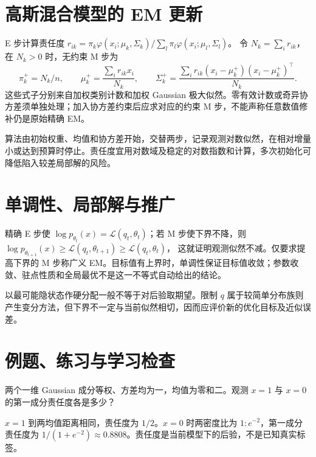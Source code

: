 \documentclass[UTF8,12pt,a4paper,fontset=fandol]{ctexbook}
\begin{document}
\section{高斯混合模型的 EM 更新}

E 步计算责任度
$r_{ik}=\pi_k\varphi(x_i;\mu_k,\Sigma_k)/\sum_l\pi_l\varphi(x_i;\mu_l,\Sigma_l)$。
令 $N_k=\sum_i r_{ik}$，在 $N_k>0$ 时，无约束 M 步为
\begin{equation}
 \pi_k^+=N_k/n,\qquad
 \mu_k^+=\frac{\sum_ir_{ik}x_i}{N_k},\qquad
 \Sigma_k^+=\frac{\sum_ir_{ik}(x_i-\mu_k^+)(x_i-\mu_k^+)^\top}{N_k}.
 \label{eq:ml-gmm-mstep}
\end{equation}
这些式子分别来自加权类别计数和加权 Gaussian 极大似然。零有效计数或奇异协方差须单独处理；加入协方差约束后应求对应的约束 M 步，不能声称任意数值修补仍是原始精确 EM。

算法由初始权重、均值和协方差开始，交替两步，记录观测对数似然，在相对增量小或达到预算时停止。责任度宜用对数域及稳定的对数指数和计算，多次初始化可降低陷入较差局部解的风险。

\section{单调性、局部解与推广}

精确 E 步使 $\log p_{\theta_t}(x)=\mathcal L(q_t,\theta_t)$；若 M 步使下界不降，则
$\log p_{\theta_{t+1}}(x)\geq\mathcal L(q_t,\theta_{t+1})\geq\mathcal L(q_t,\theta_t)$，
这就证明观测似然不减。仅要求提高下界的 M 步称广义 EM。目标值有上界时，单调性保证目标值收敛；参数收敛、驻点性质和全局最优不是这一不等式自动给出的结论。

以最可能隐状态作硬分配一般不等于对后验取期望。限制 $q$ 属于较简单分布族则产生变分方法，但下界不一定与当前似然相切，因而应评价新的优化目标及近似误差。

\section{例题、练习与学习检查}

\begin{example}[软责任度]
两个一维 Gaussian 成分等权、方差均为一，均值为零和二。观测 $x=1$ 与 $x=0$ 的第一成分责任度各是多少？
\end{example}
\begin{solve}
$x=1$ 到两均值距离相同，责任度为 $1/2$。$x=0$ 时两密度比为 $1:e^{-2}$，第一成分责任度为 $1/(1+e^{-2})\approx0.8808$。责任度是当前模型下的后验，不是已知真实标签。
\end{solve}
\end{document}

